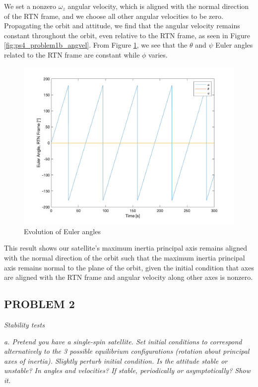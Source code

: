 We set a nonzero $\omega_z$ angular velocity, which is aligned with the normal direction of the RTN frame, and we choose all other angular velocities to be zero. Propagating the orbit and attitude, we find that the angular velocity remains constant throughout the orbit, even relative to the RTN frame, as seen in Figure \ref{fig:ps4_problem1b_angvel}. From Figure \ref{fig:ps4_problem1b_euler}, we see that the $\theta$ and $\psi$ Euler angles related to the RTN frame are constant while $\phi$ varies.

\begin{figure}[H]
\centering
\includegraphics[scale=0.6]{Images/ps4_problem1b_euler.png}
\caption{Evolution of Euler angles}
\label{fig:ps4_problem1b_euler}
\end{figure}

This result shows our satellite's maximum inertia principal axis remains aligned with the normal direction of the orbit such that the maximum inertia principal axis remains normal to the plane of the orbit, given the initial condition that axes are aligned with the RTN frame and angular velocity along other axes is nonzero.

\subsection{PROBLEM 2}
\textit{Stability tests}

\textit{a. Pretend you have a single-spin satellite. Set initial conditions to correspond alternatively to the 3 possible equilibrium configurations (rotation about principal axes of inertia). Slightly perturb initial condition. Is the attitude stable or unstable? In angles and velocities? If stable, periodically or asymptotically? Show it.}

